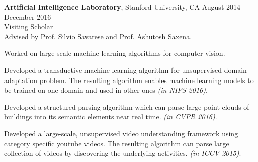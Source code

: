  \textbf{Artificial Intelligence Laboratory}, Stanford University, CA \hfill August 2014 \textendash ~ December 2016 \vspace{0mm}\\\vspace{0mm}
 \hspace{-1mm}Visiting Scholar  \hfill \vspace{1.5mm} \\
 Advised by Prof. Silvio Savarese and Prof. Ashutosh Saxena.

Worked on large-scale machine learning algorithms for computer vision.

\newpage

Developed a transductive machine learning algorithm for unsupervised domain adaptation problem. The resulting algorithm enables machine learning models to be trained on one domain and used in other ones \emph{(in NIPS 2016)}.

  Developed a structured parsing algorithm which can parse large point clouds of buildings into its semantic elements near real time. \emph{(in CVPR 2016)}.

  Developed a large-scale, unsupervised video understanding framework using category specific youtube videos. The resulting algorithm can parse large collection of videos by discovering the underlying activities. \emph{(in ICCV 2015)}.

